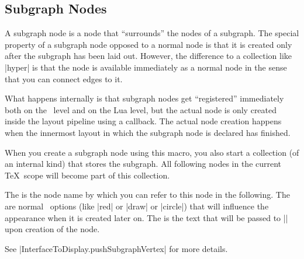 \subsection{Subgraph Nodes}

\begin{command}{\pgfgdsubgraphnode{}}
    A subgraph node is a node that ``surrounds'' the nodes of a subgraph. The
    special property of a subgraph node opposed to a normal node is that it is
    created only after the subgraph has been laid out. However, the difference
    to a collection like |hyper| is that the node is available immediately as a
    normal node in the sense that you can connect edges to it.

    What happens internally is that subgraph nodes get ``registered''
    immediately both on the \pgfname\ level and on the Lua level, but the
    actual node is only created inside the layout pipeline using a callback.
    The actual node creation happens when the innermost layout in which the
    subgraph node is declared has finished.

    When you create a subgraph node using this macro, you also start a
    collection (of an internal kind) that stores the subgraph. All following
    nodes in the current \TeX\ scope will become part of this collection.

    The  is the node name by which you can refer to this node in the
    following. The  are normal \pgfname\ options (like |red|
    or |draw| or |circle|) that will influence the appearance when it is
    created later on. The  is the text that will be passed to
    |\pgfnode| upon creation of the node.

    See |InterfaceToDisplay.pushSubgraphVertex| for more details.
\end{command}
